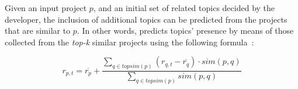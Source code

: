 






Given an input project $p$, and an initial set of related topics decided by the 
developer, the inclusion 
of 
additional topics can be predicted from the projects that are similar to $p$. 
In other words, \TF predicts topics' presence by means of those collected from 
the \emph{top-k} similar projects using the following 
formula~\cite{NGUYEN2020110460}:

\begin{equation} \label{eqn:Prediction}
r_{p,t}=\overline{r_{p}}+\frac{\sum_{q \in topsim(p)}(r_{q,t}-\overline{r_{q}})\cdot sim(p,q) }{\sum_{q \in topsim(p)} sim(p,q) } %
\end{equation}

